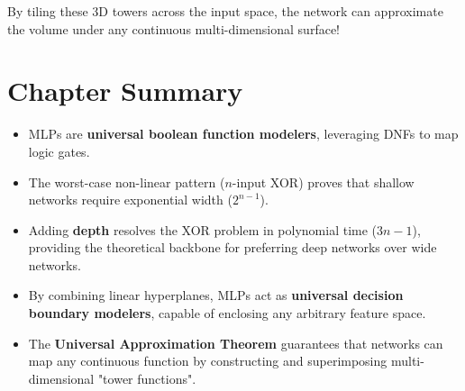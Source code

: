By tiling these 3D towers across the input space, the network can approximate the volume under any continuous multi-dimensional surface!


\section{Chapter Summary}

\begin{itemize}
    \item MLPs are \textbf{universal boolean function modelers}, leveraging DNFs to map logic gates.
    \item The worst-case non-linear pattern ($n$-input XOR) proves that shallow networks require exponential width ($2^{n-1}$).
    \item Adding \textbf{depth} resolves the XOR problem in polynomial time ($3n-1$), providing the theoretical backbone for preferring deep networks over wide networks.
    \item By combining linear hyperplanes, MLPs act as \textbf{universal decision boundary modelers}, capable of enclosing any arbitrary feature space.
    \item The \textbf{Universal Approximation Theorem} guarantees that networks can map any continuous function by constructing and superimposing multi-dimensional "tower functions".
\end{itemize}
